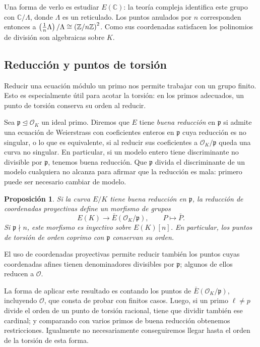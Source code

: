 \documentclass[a4paper]{book}
\theoremstyle{definition}
\theoremstyle{plain}
\newtheorem*{prop*}{Proposición}
\newcommand{\CC}{\mathbb{C}}
\newcommand{\ZZ}{\mathbb{Z}}
\newcommand{\OO}{\mathcal{O}}
\newcommand{\pp}{\mathfrak{p}}
\newcommand{\lp}{\left\lparen}
\newcommand{\rp}{\right\rparen}
\begin{document}
Una forma de verlo es estudiar $E(\CC)$: la teoría compleja identifica este grupo con $\CC/\Lambda$, donde $\Lambda$ es un reticulado. Los puntos anulados por $n$ corresponden entonces a $\lp\frac{1}{n}\Lambda\rp/\Lambda\cong{(\ZZ/n\ZZ)}^2$. Como sus coordenadas satisfacen los polinomios de división son algebraicas sobre $K$. 

\subsection{Reducción y puntos de torsión}

Reducir una ecuación módulo un primo nos permite trabajar con un grupo finito. Esto es especialmente útil para acotar la torsión: en los primos adecuados, un punto de torsión conserva su orden al reducir.

Sea $\pp\trianglelefteq\OO_K$ un ideal primo. Diremos que $E$ tiene \emph{buena reducción} en $\pp$ si admite una ecuación de Weierstrass con coeficientes enteros en $\pp$ cuya reducción es no singular, o lo que es equivalente, si al reducir sus coeficientes a $\OO_K/\pp$ queda una curva no singular. En particular, si un modelo entero tiene discriminante no divisible por $\pp$, tenemos buena reducción. Que $\pp$ divida el discriminante de un modelo cualquiera no alcanza para afirmar que la reducción es mala: primero puede ser necesario cambiar de modelo.

\begin{prop*}
Si la curva $E/K$ tiene buena reducción en $\pp$, la reducción de coordenadas proyectivas define un morfismo de grupos
\[
E(K)\longrightarrow\bar{E}(\OO_K/\pp),\qquad P\longmapsto\bar{P}.
\]
Si $\pp \nmid n$, este morfismo es inyectivo sobre $E(K)[n]$. En particular, los puntos de torsión de orden coprimo con $\pp$ conservan su orden.
\end{prop*}

El uso de coordenadas proyectivas permite reducir también los puntos cuyas coordenadas afines tienen denominadores divisibles por $\pp$; algunos de ellos reducen a $\OO$. 

La forma de aplicar este resultado es contando los puntos de $\bar{E}(\OO_K/\pp)$, incluyendo $\OO$, que consta de probar con finitos casos. Luego, si un primo $\ell\neq p$ divide el orden de un punto de torsión racional, tiene que dividir también ese cardinal; y comparando con varios primos de buena reducción obtenemos restricciones. Igualmente no necesariamente conseguiremos llegar hasta el orden de la torsión de esta forma.
\end{document}
